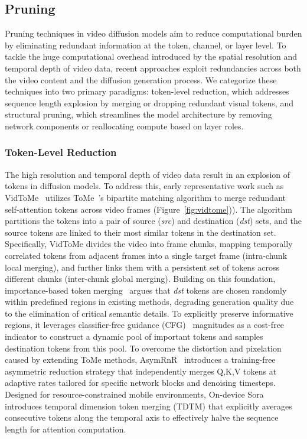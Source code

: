 \documentclass[lettersize,journal]{IEEEtran}
\begin{document}
\subsection{Pruning}
Pruning techniques in video diffusion models aim to reduce computational burden by eliminating redundant information at the token, channel, or layer level. To tackle the huge computational overhead introduced by the spatial resolution and temporal depth of video data, recent approaches exploit redundancies across both the video content and the diffusion generation process. We categorize these techniques into two primary paradigms: token-level reduction, which addresses sequence length explosion by merging or dropping redundant visual tokens, and structural pruning, which streamlines the model architecture by removing network components or reallocating compute based on layer roles.


\subsubsection{Token-Level Reduction}
The high resolution and temporal depth of video data result in an explosion of tokens in diffusion models. To address this, early representative work such as {VidToMe}~\cite{li2024vidtome} utilizes ToMe~\cite{bolya2023token}'s bipartite matching algorithm to merge redundant self-attention tokens across video frames (Figure~\ref{fig:vidtome})). The algorithm partitions the tokens into a pair of source (\textit{src}) and destination (\textit{dst}) sets, and the source tokens are linked to their most similar tokens in the destination set. Specifically, VidToMe divides the video into frame chunks, mapping temporally correlated tokens from adjacent frames into a single target frame (intra-chunk local merging), and further links them with a persistent set of tokens across different chunks (inter-chunk global merging). Building on this foundation, importance-based token merging~\cite{wu2025importance} argues that \textit{dst} tokens are chosen randomly within predefined regions in existing methods, degrading generation quality due to the elimination of critical semantic details. To explicitly preserve informative regions, it leverages classifier-free guidance (CFG)~\cite{ho2022classifier} magnitudes as a cost-free indicator to construct a dynamic pool of important tokens and samples destination tokens from this pool.
To overcome the distortion and pixelation caused by extending ToMe methods, {AsymRnR}~\cite{sun2025asymrnr} introduces a training-free asymmetric reduction strategy that independently merges Q,K,V tokens at adaptive rates tailored for specific network blocks and denoising timesteps. Designed for resource-constrained mobile environments, On-device Sora~\cite{kim2025device} introduces temporal dimension token merging (TDTM) that explicitly averages consecutive tokens along the temporal axis to effectively halve the sequence length for attention computation.
\end{document}
